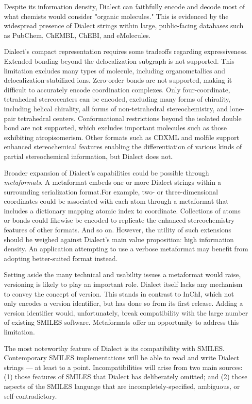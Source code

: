 \documentclass{article}
\begin{document}
Despite its information density, Dialect can faithfully encode and decode most of what chemists would consider "organic molecules." This is evidenced by the widespread presence of Dialect strings within large, public-facing databases such as PubChem, ChEMBL, ChEBI, and eMolecules.

Dialect's compact representation requires some tradeoffs regarding expressiveness. Extended bonding beyond the delocalization subgraph is not supported. This limitation excludes many types of molecule, including organometallics and delocalization-\-stabilized ions. Zero-\-order bonds are not supported, making it difficult to accurately encode coordination complexes. Only four-\-coordinate, tetrahedral stereocenters can be encoded, excluding many forms of chirality, including helical chirality, all forms of non-\-tetrahedral stereochemistry, and lone-\-pair tetrahedral centers. Conformational restrictions beyond the isolated double bond are not supported, which excludes important molecules such as those exhibiting atropisomerism. Other formats such as CDXML and molfile support enhanced stereochemical features enabling the differentiation of various kinds of partial stereochemical information, but Dialect does not.

Broader expansion of Dialect's capabilities could be possible through \textit{metaformats}. A metaformat embeds one or more Dialect strings within a surrounding serialization format.For example, two- or three-dimensional coordinates could be associated with each atom through a metaformat that includes a dictionary mapping atomic index to coordinate. Collections of atoms or bonds could likewise be encoded to replicate the enhanced stereochemistry features of other formats. And so on. However, the utility of such extensions should be weighed against Dialect's main value proposition: high information density. An application attempting to use a verbose metaformat may benefit from adopting better-suited format instead.

Setting aside the many technical and usability issues a metaformat would raise, versioning is likely to play an important role. Dialect itself lacks any mechanism to convey the concept of version. This stands in contrast to InChI, which not only encodes a version identifier, but has done so from its first release. Adding a version identifier would, unfortunately, break compatibility with the large number of existing SMILES software. Metaformats offer an opportunity to address this limitation.

The most noteworthy feature of Dialect is its compatibility with SMILES. Contemporary SMILES implementations will be able to read and write Dialect strings --- at least to a point. Incompatibilities will arise from two main sources: (1) those features of SMILES that Dialect has deliberately omitted; and (2) those aspects of the SMILES language that are incompletely-specified, ambiguous, or self-contradictory.
\end{document}
